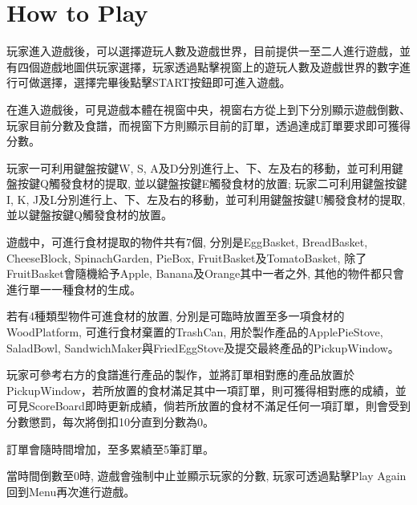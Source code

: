 \section{How to Play}

玩家進入遊戲後，可以選擇遊玩人數及遊戲世界，目前提供一至二人進行遊戲，並有四個遊戲地圖供玩家選擇，玩家透過點擊視窗上的遊玩人數及遊戲世界的數字進行可做選擇，選擇完畢後點擊START按鈕即可進入遊戲。

在進入遊戲後，可見遊戲本體在視窗中央，視窗右方從上到下分別顯示遊戲倒數、玩家目前分數及食譜，而視窗下方則顯示目前的訂單，透過達成訂單要求即可獲得分數。
 
玩家一可利用鍵盤按鍵W, S, A及D分別進行上、下、左及右的移動，並可利用鍵盤按鍵Q觸發食材的提取, 並以鍵盤按鍵E觸發食材的放置; 玩家二可利用鍵盤按鍵I, K, J及L分別進行上、下、左及右的移動，並可利用鍵盤按鍵U觸發食材的提取, 並以鍵盤按鍵Q觸發食材的放置。

遊戲中，可進行食材提取的物件共有7個, 分別是EggBasket, BreadBasket, CheeseBlock, SpinachGarden, PieBox, FruitBasket及TomatoBasket, 除了FruitBasket會隨機給予Apple, Banana及Orange其中一者之外, 其他的物件都只會進行單一一種食材的生成。

若有4種類型物件可進食材的放置, 分別是可臨時放置至多一項食材的WoodPlatform, 可進行食材棄置的TrashCan, 用於製作產品的ApplePieStove, SaladBowl, SandwichMaker與FriedEggStove及提交最終產品的PickupWindow。

玩家可參考右方的食譜進行產品的製作，並將訂單相對應的產品放置於PickupWindow，若所放置的食材滿足其中一項訂單，則可獲得相對應的成績，並可見ScoreBoard即時更新成績，倘若所放置的食材不滿足任何一項訂單，則會受到分數懲罰，每次將倒扣10分直到分數為0。

訂單會隨時間增加，至多累績至5筆訂單。

當時間倒數至0時, 遊戲會強制中止並顯示玩家的分數, 玩家可透過點擊Play Again回到Menu再次進行遊戲。

